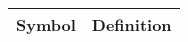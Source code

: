 \documentclass[crop=false,10pt,ngerman]{standalone}
\begin{document}
{\begin{tabularx}{\textwidth}{p{}p{}}


    \end{tabularx}

    \newpage
    \thispagestyle{sectionstyle}
    \noindent
    \begin{tabularx}{\textwidth}{p{}p{}}
      \hline
      \textbf{Symbol} & \textbf{Definition} \\
      \hline
      \hline


\end{tabularx}}
\end{document}
